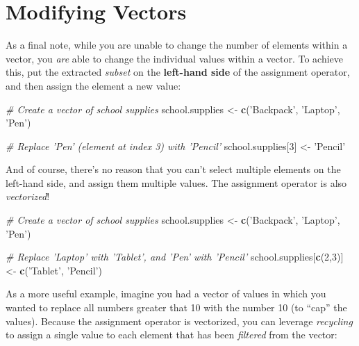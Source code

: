 \documentclass[]{book}
\newenvironment{Shaded}{\begin{snugshade}}{\end{snugshade}}
\newcommand{\KeywordTok}[1]{\textcolor[rgb]{0.13,0.29,0.53}{\textbf{#1}}}
\newcommand{\DecValTok}[1]{\textcolor[rgb]{0.00,0.00,0.81}{#1}}
\newcommand{\StringTok}[1]{\textcolor[rgb]{0.31,0.60,0.02}{#1}}
\newcommand{\CommentTok}[1]{\textcolor[rgb]{0.56,0.35,0.01}{\textit{#1}}}
\newcommand{\NormalTok}[1]{#1}
\theoremstyle{definition}
\theoremstyle{definition}
\theoremstyle{remark}
\begin{document}
\section{Modifying Vectors}\label{modifying-vectors}

As a final note, while you are unable to change the number of elements
within a vector, you \emph{are} able to change the individual values
within a vector. To achieve this, put the extracted \emph{subset} on the
\textbf{left-hand side} of the assignment operator, and then assign the
element a new value:

\begin{Shaded}
\begin{Highlighting}[]
\CommentTok{# Create a vector of school supplies}
\NormalTok{school.supplies <-}\StringTok{ }\KeywordTok{c}\NormalTok{(}\StringTok{'Backpack'}\NormalTok{, }\StringTok{'Laptop'}\NormalTok{, }\StringTok{'Pen'}\NormalTok{)}

\CommentTok{# Replace 'Pen' (element at index 3) with 'Pencil'}
\NormalTok{school.supplies[}\DecValTok{3}\NormalTok{] <-}\StringTok{ 'Pencil'}
\end{Highlighting}
\end{Shaded}

And of course, there's no reason that you can't select multiple elements
on the left-hand side, and assign them multiple values. The assignment
operator is also \emph{vectorized}!

\begin{Shaded}
\begin{Highlighting}[]
\CommentTok{# Create a vector of school supplies}
\NormalTok{school.supplies <-}\StringTok{ }\KeywordTok{c}\NormalTok{(}\StringTok{'Backpack'}\NormalTok{, }\StringTok{'Laptop'}\NormalTok{, }\StringTok{'Pen'}\NormalTok{)}

\CommentTok{# Replace  'Laptop' with 'Tablet', and 'Pen' with 'Pencil'}
\NormalTok{school.supplies[}\KeywordTok{c}\NormalTok{(}\DecValTok{2}\NormalTok{,}\DecValTok{3}\NormalTok{)] <-}\StringTok{ }\KeywordTok{c}\NormalTok{(}\StringTok{'Tablet'}\NormalTok{, }\StringTok{'Pencil'}\NormalTok{)}
\end{Highlighting}
\end{Shaded}

As a more useful example, imagine you had a vector of values in which
you wanted to replace all numbers greater that 10 with the number 10 (to
``cap'' the values). Because the assignment operator is vectorized, you
can leverage \emph{recycling} to assign a single value to each element
that has been \emph{filtered} from the vector:
\end{document}
